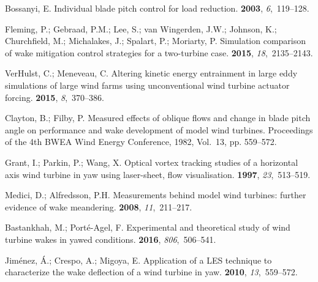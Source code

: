 \documentclass[energies,article,submit,moreauthors,latex,10pt,a4paper]{mdpi}
\begin{document}
\begin{thebibliography}{999}
	Bossanyi, E.
	\newblock Individual blade pitch control for load reduction.
	 {\bf 2003}, {\em 6},~119--128.
	
	Fleming, P.; Gebraad, P.M.; Lee, S.; van Wingerden, J.W.; Johnson, K.;
	Churchfield, M.; Michalakes, J.; Spalart, P.; Moriarty, P.
	\newblock Simulation comparison of wake mitigation control strategies for a
	two-turbine case.
	 {\bf 2015}, {\em 18},~2135--2143.
	
	VerHulst, C.; Meneveau, C.
	\newblock Altering kinetic energy entrainment in large eddy simulations of
	large wind farms using unconventional wind turbine actuator forcing.
	 {\bf 2015}, {\em 8},~370--386.
	
	Clayton, B.; Filby, P.
	\newblock Measured effects of oblique flows and change in blade pitch angle on
	performance and wake development of model wind turbines.
	\newblock  Proceedings of the 4th BWEA Wind Energy Conference,  1982, Vol.~13,
	pp. 559--572.
	
	Grant, I.; Parkin, P.; Wang, X.
	\newblock Optical vortex tracking studies of a horizontal axis wind turbine in
	yaw using laser-sheet, flow visualisation.
	 {\bf 1997}, {\em 23},~513--519.
	
	Medici, D.; Alfredsson, P.H.
	\newblock Measurements behind model wind turbines: further evidence of wake
	meandering.
	 {\bf 2008}, {\em 11},~211--217.
	
	Bastankhah, M.; Port{\'e}-Agel, F.
	\newblock Experimental and theoretical study of wind turbine wakes in yawed
	conditions.
	 {\bf 2016}, {\em 806},~506--541.
	
	Jim{\'e}nez, {\'A}.; Crespo, A.; Migoya, E.
	\newblock Application of a LES technique to characterize the wake deflection of
	a wind turbine in yaw.
	 {\bf 2010}, {\em 13},~559--572.
	

\end{thebibliography}
\end{document}
